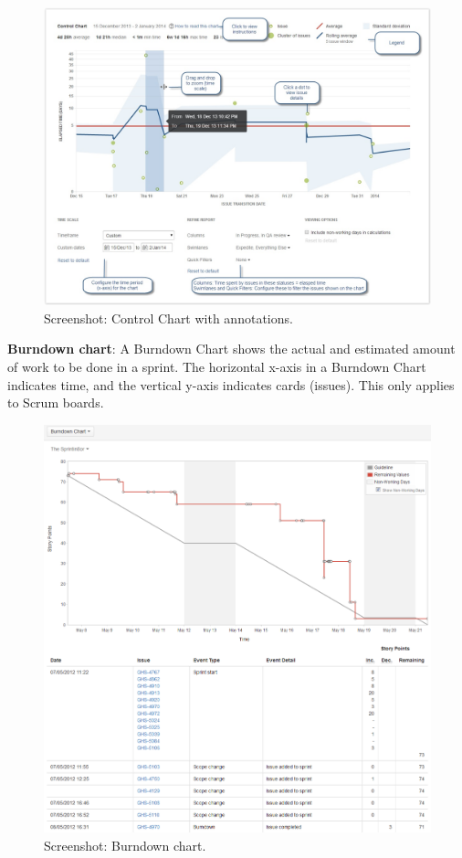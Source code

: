 \begin{figure}[h]
	\centering
	\includegraphics[scale=0.4]{img/agile-controlchart-annotated.jpg}
	\caption{Screenshot: Control Chart with annotations.} 
	\label{fig:agile-controlchart-annotated}
\end{figure}

\textbf{Burndown chart}: A Burndown Chart shows the actual and estimated amount of work to be done in a sprint. The horizontal x-axis in a Burndown Chart indicates time, and the vertical y-axis indicates cards (issues). This only applies to Scrum boards.

\begin{figure}[h]
	\centering
	\includegraphics[scale=0.4]{img/burndown-chart.png}
	\caption{Screenshot: Burndown chart.} 
	\label{fig:burndown-chart}
\end{figure}

